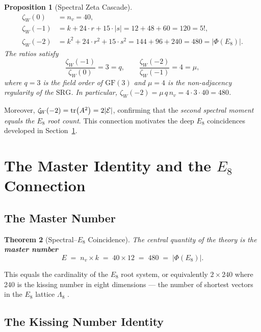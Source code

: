 \documentclass[12pt,a4paper]{article}
\newtheorem{theorem}{Theorem}[section]
\newtheorem{proposition}[theorem]{Proposition}
\newcommand{\SRG}{\mathrm{SRG}}
\newcommand{\Eone}{E_8}
\newcommand{\nv}{n_{\!v}}
\newcommand{\zetaW}{\zeta_{\!W}}
\newcommand{\GF}{\mathrm{GF}}
\begin{document}
\begin{proposition}[Spectral Zeta Cascade]
\label{prop:zetacascade}
\begin{align}
  \zetaW(0) &= \nv = 40,\\
  \zetaW(-1) &= k + 24\cdot r + 15\cdot |s| = 12 + 48 + 60 = 120 = 5!,\\
  \zetaW(-2) &= k^2 + 24\cdot r^2 + 15\cdot s^2 = 144 + 96 + 240 = 480
               = |\Phi(\Eone)|.
\end{align}
The ratios satisfy
\[
  \frac{\zetaW(-1)}{\zetaW(0)} = 3 = q,
  \qquad
  \frac{\zetaW(-2)}{\zetaW(-1)} = 4 = \mu,
\]
where $q=3$ is the field order of $\GF(3)$ and $\mu=4$ is the
non-adjacency regularity of the $\SRG$.  In particular,
$\zetaW(-2) = \mu\,q\,\nv = 4\cdot 3\cdot 40 = 480$.
\end{proposition}

Moreover, $\zetaW(-2) = \tr(A^2) = 2|\mathcal{E}|$, confirming that
the \emph{second spectral moment equals the $E_8$ root count}.
This connection motivates the deep $E_8$ coincidences developed
in Section~\ref{sec:master}.

\section{The Master Identity and the $E_8$ Connection}
\label{sec:master}

\subsection{The Master Number}

\begin{theorem}[Spectral--$\Eone$ Coincidence]
The central quantity of the theory is the \textbf{master number}
\[
  \boxed{E \;=\; \nv \times k \;=\; 40 \times 12 \;=\; 480 \;=\; |\Phi(\Eone)|.}
\]
\end{theorem}

This equals the cardinality of the $\Eone$ root system, or
equivalently $2\times 240$ where 240 is the kissing number in eight
dimensions --- the number of shortest vectors in the $\Eone$ lattice
$\Lambda_8$ \cite{Viazovska2017}.

\subsection{The Kissing Number Identity}
\end{document}
